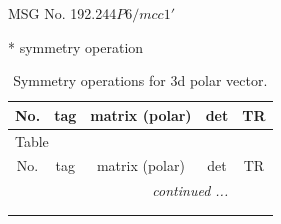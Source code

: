 \documentclass[fleqn,8pt]{jsarticle}
\begin{document}
\setcounter{MaxMatrixCols}{32}

\renewcommand{\tablename}{Table~}
\renewcommand{\figurename}{Figure~}
\begin{center}
\LARGE
MSG No. 192.244\quad$P6/mcc1'$
\end{center}
* symmetry operation
\renewcommand{\arraystretch}{1.3}
\begin{longtable}{ccccc}
\caption{Symmetry operations for 3d polar vector.}
 \\
 \hline \hline
No. & tag & matrix (polar) & det & TR \\ \hline \endfirsthead

\multicolumn{4}{l}{\tablename\ \thetable{}} \\
 \hline \hline
No. & tag & matrix (polar) & det & TR \\ \hline \endhead

 \hline \hline
\multicolumn{4}{r}{\footnotesize\it continued ...} \\ \endfoot

 \hline \hline
\multicolumn{4}{r}{} \\ \endlastfoot


\end{longtable}
\end{document}
